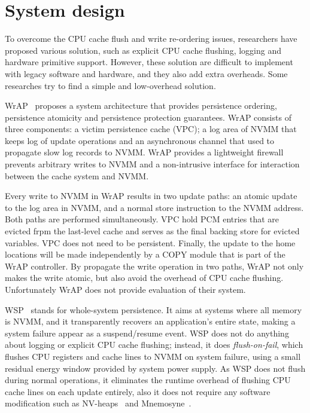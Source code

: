 \section{System design} 
\label{sec:systemdesign}

To overcome the CPU cache flush and write re-ordering issues, researchers
have proposed various solution, such as explicit CPU cache flushing, logging
and hardware primitive support. However, these solution are difficult
to implement with legacy software and hardware, and they also add extra
overheads. Some researches try to find a simple and low-overhead solution.

WrAP~\cite{WrAP} proposes a system architecture that provides persistence
ordering, persistence atomicity and persistence protection guarantees. 
WrAP consists of three components: a victim persistence cache (VPC); a log
area of NVMM that keeps log of update operations and an asynchronous channel
that used to propagate slow log records to NVMM. WrAP provides a lightweight
firewall prevents arbitrary writes to NVMM and a non-intrusive interface
for interaction between the cache system and NVMM.

Every write to NVMM in WrAP results in two update paths: an atomic update to
the log area in NVMM, and a normal store instruction to the NVMM address. Both
paths are performed simultaneously. VPC hold PCM entries that are evicted
frpm the last-level cache and serves as the final backing store for evicted
variables. VPC does not need to be persistent.
Finally, the update to the home locations will be made
independently by a COPY module that is part of the WrAP controller. 
By propagate the write operation in two paths, WrAP not only makes the 
write atomic, but also avoid the overhead of CPU cache flushing.
Unfortunately WrAP does not provide evaluation of their system.

WSP~\cite{WSP} stands for whole-system persistence. It aims at systems where
all memory is NVMM, and it transparently recovers an application's entire state,
making a system failure appear as a suspend/resume event. WSP does not
do anything about logging or explicit CPU cache flushing; instead, it does 
\emph{flush-on-fail}, which flushes CPU registers and cache lines to NVMM
on system failure, using a small residual energy window provided by system
power supply. As WSP does not flush during normal operations, it eliminates
the runtime overhead of flushing CPU cache lines on each update entirely, also
it does not require any software modification such as NV-heaps~\cite{nvheaps}
 and Mnemosyne~\cite{mnemosyne}.

